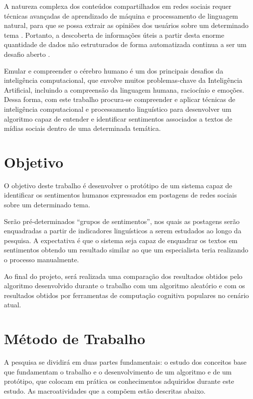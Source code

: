\documentclass[
	12pt,				%
	openright,			%
	oneside,			%
	a4paper,			%
	english,			%
	spanish,			%
	brazil				%
	]{abntex2}
\begin{document}
	A natureza complexa dos conteúdos compartilhados em redes sociais requer técnicas avançadas de aprendizado de máquina e processamento de linguagem natural, para que se possa extrair as opiniões dos usuários sobre um determinado tema \cite{article_sentiment_twitter}. Portanto, a descoberta de informações úteis a partir desta enorme quantidade de dados não estruturados de forma automatizada continua a ser um desafio aberto \cite{article_tweet_crisis}.

	Emular e compreender o cérebro humano é um dos principais desafios da inteligência computacional, que envolve muitos problemas-chave da Inteligência Artificial, incluindo a compreensão da linguagem humana, raciocínio e emoções. Dessa forma, com este trabalho procura-se compreender e aplicar técnicas de inteligência computacional e processamento linguístico para desenvolver um algoritmo capaz de entender e identificar sentimentos associados a textos de mídias sociais dentro de uma determinada temática. 
	
	\section{Objetivo}
	O objetivo deste trabalho é desenvolver o protótipo de um sistema capaz de identificar os sentimentos humanos expressados em postagens de redes sociais sobre um determinado tema.
	
	 Serão pré-determinados “grupos de sentimentos”, nos quais as postagens serão enquadradas a partir de indicadores linguísticos a serem estudados ao longo da pesquisa. A expectativa é que o sistema seja capaz de enquadrar os textos em sentimentos obtendo um resultado similar ao que um especialista teria realizando o processo manualmente.
	
	Ao final do projeto, será realizada uma comparação dos resultados obtidos pelo algoritmo desenvolvido durante o trabalho com um algoritmo aleatório e com os resultados obtidos por ferramentas de computação cognitiva populares no cenário atual.	
	
	\section{Método de Trabalho}
	   
	   A pesquisa se dividirá em duas partes fundamentais: o estudo dos conceitos base que fundamentam o trabalho e o desenvolvimento de um algoritmo e de um protótipo, que colocam em prática os conhecimentos adquiridos durante este estudo. As macroatividades que a compõem estão descritas abaixo.
		
\end{document}
